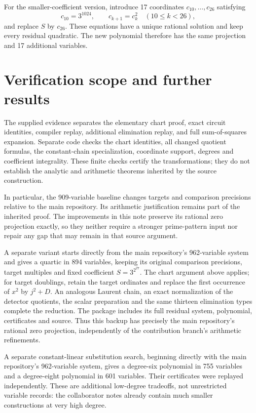 \documentclass[11pt]{article}
\begin{document}
For the smaller-coefficient version, introduce 17 coordinates $c_{10},\ldots,c_{26}$ satisfying
\[
 c_{10}=3^{1024},\qquad c_{k+1}=c_k^2\quad(10\le k<26),
\]
and replace $S$ by $c_{26}$. These equations have a unique rational solution and keep every residual quadratic. The new polynomial therefore has the same projection and 17 additional variables.

\section{Verification scope and further results}
The supplied evidence separates the elementary chart proof, exact circuit identities, compiler replay, additional elimination replay, and full sum-of-squares expansion. Separate code checks the chart identities, all changed quotient formulas, the constant-chain specialization, coordinate support, degrees and coefficient integrality. These finite checks certify the transformations; they do not establish the analytic and arithmetic theorems inherited by the source construction.

In particular, the 909-variable baseline changes targets and comparison precisions relative to the main repository. Its arithmetic justification remains part of the inherited proof. The improvements in this note preserve its rational zero projection exactly, so they neither require a stronger prime-pattern input nor repair any gap that may remain in that source argument.

A separate variant starts directly from the main repository's 962-variable system and gives a quartic in 894 variables, keeping its original comparison precisions, target multiples and fixed coefficient $S=3^{2^{27}}$. The chart argument above applies; for target doublings, retain the target ordinates and replace the first occurrence of $x^2$ by $j^2+D$. An analogous Laurent chain, an exact normalization of the detector quotients, the scalar preparation and the same thirteen elimination types complete the reduction. The package includes its full residual system, polynomial, certificates and source. Thus this backup has precisely the main repository's rational zero projection, independently of the contribution branch's arithmetic refinements.

A separate constant-linear substitution search, beginning directly with the main repository's 962-variable system, gives a degree-six polynomial in 755 variables and a degree-eight polynomial in 601 variables. Their certificates were replayed independently. These are additional low-degree tradeoffs, not unrestricted variable records: the collaborator notes already contain much smaller constructions at very high degree.
\end{document}
